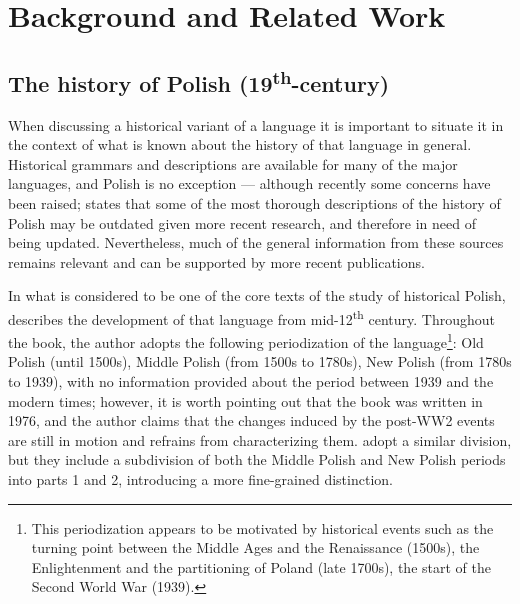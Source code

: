 \section{Background and Related Work}
\label{sec:background}

\subsection{The history of Polish (19\textsuperscript{th}-century)}
\label{subsec:history-pl}

When discussing a historical variant of a language it is important to situate it in the context of what is known about the history of that language in general. Historical grammars and descriptions are available for many of the major languages, and Polish is no exception --- although recently some concerns have been raised; \citet{dunaj_19} states that some of the most thorough descriptions of the history of Polish may be outdated given more recent research, and therefore in need of being updated. Nevertheless, much of the general information from these sources remains relevant and can be supported by more recent publications.

In what is considered to be one of the core texts of the study of historical Polish, \citet{klemensiewicz_76} describes the development of that language from mid-12\textsuperscript{th} century. Throughout the book, the author adopts the following periodization of the language\footnote{This periodization appears to be motivated by historical events such as the turning point between the Middle Ages and the Renaissance (1500s), the Enlightenment and the partitioning of Poland (late 1700s), the start of the Second World War (1939).}: Old Polish (until 1500s), Middle Polish (from 1500s to 1780s), New Polish (from 1780s to 1939), with no information provided about the period between 1939 and the modern times; however, it is worth pointing out that the book was written in 1976, and the author claims that the changes induced by the post-WW2 events are still in motion and refrains from characterizing them. \citet{długosz-kurczabowa_dubisz_2006} adopt a similar division, but they include a subdivision of both the Middle Polish and New Polish periods into parts 1 and 2, introducing a more fine-grained distinction. 

